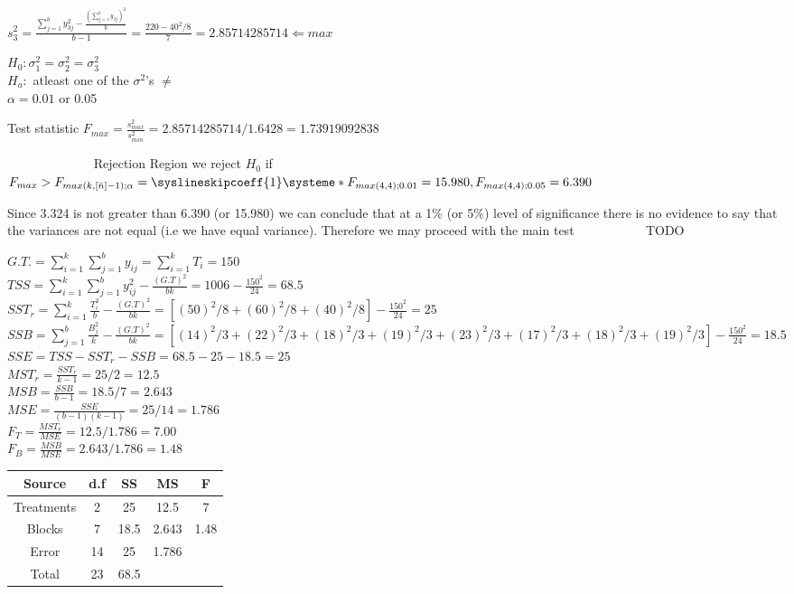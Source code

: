 \documentclass{article}
\begin{document}
\begin{enumerate}[1.]
$s_3^2 = \frac{
\sum_{j=1}^{b} {y_{3j}^2} - \frac{ (\sum_{j=1}^{b}{y_{3j}})^2}{b}
}{
b - 1
}
=
\frac{
220 - 40^2 / 8
}{7}
= 2.85714285714 \Leftarrow max
$

$H_0: \sigma_1^2 = \sigma_2^2 = \sigma_3^2$ \\
$H_a:$ atleast one of the $\sigma^2$'s $\neq $\\
$ \alpha = 0.01$ or 0.05

Test statistic $F_{max} = \frac{s_{max}^2}{s_{min}^2} = 2.85714285714 / 1.6428 = 1.73919092838$

~~~~~~~~~~~~~
Rejection Region we reject $H_0$ if $F_{max} > F_{max(k, [\bar{n}]-1); \alpha} =
\syslineskipcoeff{1}
\systeme*{F_{max(4, 4);0.01}=15.980,F_{max(4,4);0.05} = 6.390}
$

Since 3.324 is not greater than 6.390 (or 15.980) we can conclude that at a 1\% (or 5\%) level of significance there is no evidence to say that the variances are not equal (i.e we have equal variance). Therefore we may proceed with the main test
~~~~~~~~~~
 TODO

$G.T. = \sum_{i=1}^{k}{ \sum_{j=1}^{b}{y_{ij}}} = \sum_{i=1}^{k}{T_i} = 150$ \\
$TSS = \sum_{i=1}^{k}{ \sum_{j=1}^{b}{y_{ij}^2}} - \frac{(G.T)^2}{bk} = 1006 - \frac{150^2}{24} = 68.5$ \\
$SST_r = \sum_{i=1}^{k}{ \frac{T_i^2}{b}} - \frac{(G.T)^2}{bk}  = [(50)^2/8 + (60)^2/8 + (40)^2/8] - \frac{150^2}{24} = 25$ \\
$SSB = \sum_{j=1}^{b}{ \frac{B_j^2}{k} - \frac{(G.T)^2}{bk}}  = [(14)^2/3 + (22)^2/3 + (18)^2/3 + (19)^2/3 + (23)^2/3 + (17)^2/3 + (18)^2/3 + (19)^2/3]  - \frac{150^2}{24} = 18.5$\\
$SSE = TSS - SST_r - SSB = 68.5 - 25 - 18.5= 25$\\

$MST_r = \frac{SST_r}{k - 1} = 25 / 2 = 12.5$ \\
$MSB = \frac{SSB}{b - 1} = 18.5 / 7 = 2.643$ \\
$MSE = \frac{SSE}{(b - 1)(k - 1)} = 25/14 = 1.786$ \\
$F_T = \frac{MST_r}{MSE} = 12.5/1.786 = 7.00$ \\
$F_B = \frac{MSB}{MSE} = 2.643/1.786 = 1.48$ \\


\begin{center}
 \begin{tabular}{||c c c c c||} 
 \hline
Source & d.f & SS & MS & F \\ [0.5ex] 
 \hline\hline
Treatments & 2 & 25 & 12.5 & 7 \\
 \hline
Blocks & 7 & 18.5 & 2.643 & 1.48  \\
\hline
Error & 14 &  25 & 1.786 &  \\
 \hline
Total & 23  &  68.5 & & \\ [1ex]
 \hline
\end{tabular}
\end{center}


\end{enumerate}
\end{document}
